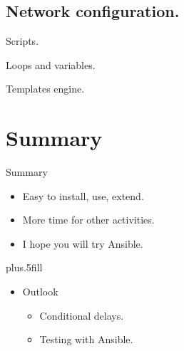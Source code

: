 \documentclass{beamer}
\begin{document}
\subsection {Network configuration.}

\begin{frame}{Scripts.}
  
\end{frame}

\begin{frame}{Loops and variables.}
  
  
\end{frame}

\begin{frame}{Templates engine.}
  
  
  
\end{frame}



\section*{Summary}

\begin{frame}{Summary}

  \begin{itemize}
  \item
    Easy to install, use, extend.
  \item
    More time for other activities.
  \item
    I hope you will try Ansible.
  \end{itemize}
  
  \vskip0pt plus.5fill
  \begin{itemize}
  \item
    Outlook
    \begin{itemize}
    \item
      Conditional delays.
    \item
      Testing with Ansible.
    \end{itemize}
  \end{itemize}
\end{frame}



\appendix
\end{document}
